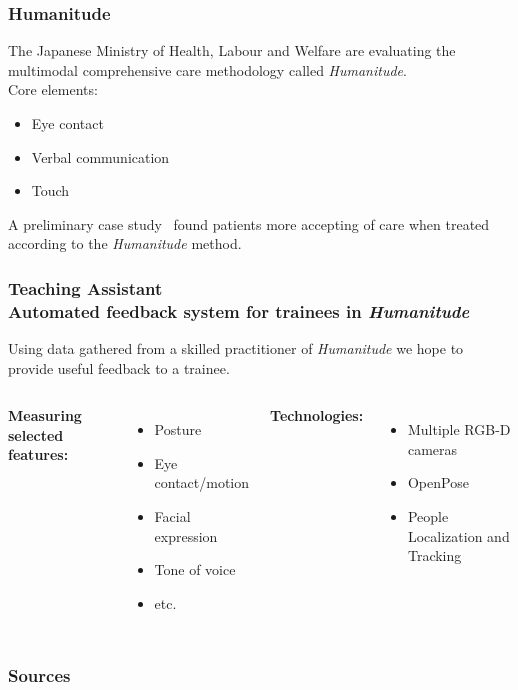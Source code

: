 \documentclass[xcolor=pdftex,dvipsnames,table]{beamer}
\begin{document}
\begin{frame}
  \frametitle{Humanitude}
  
  The Japanese Ministry of Health, Labour and Welfare are evaluating the multimodal comprehensive care methodology called \emph{Humanitude}.\\
  \vspace{.7em} \pause
  Core elements: \\
  \begin{itemize}
  \item Eye contact
  \item Verbal communication
  \item Touch
  \end{itemize}\pause

  A preliminary case study~\cite{hindawi2016case} found patients more accepting of care when treated according to the \emph{Humanitude} method.\\

\end{frame}


\begin{frame}
  \frametitle{Teaching Assistant\\{\small Automated feedback system for trainees in \emph{Humanitude}}}
  Using data gathered from a skilled practitioner of \emph{Humanitude} we hope to provide useful feedback to a trainee.\\
  \vspace{1em} \pause
  \begin{columns}[t]
    \textbf{Measuring selected features:}
    \begin{itemize}
    \item Posture
    \item Eye contact/motion
    \item Facial expression
    \item Tone of voice
    \item etc.
    \end{itemize} \pause
    \textbf{Technologies:}
    \begin{itemize}
    \item Multiple RGB-D cameras
    \item OpenPose~\cite{cao2017realtime}
    \item People Localization and Tracking
    \end{itemize}
  \end{columns}
  
\end{frame}

\begin{frame}
  \frametitle{Sources}
  
  
\end{frame}
\end{document}
